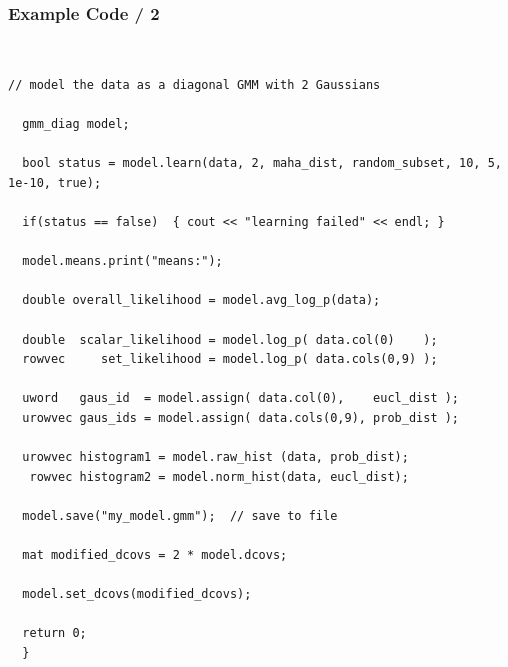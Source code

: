 \documentclass[usenames,dvipsnames]{beamer}
\begin{document}
\begin{frame}[fragile=singleslide]
\frametitle{Example Code / 2}

\vspace{-0.5ex}
\begin{minipage}{1.00\textwidth}
\begin{minipage}{0.05\textwidth}
~
\end{minipage}
\begin{minipage}{0.90\textwidth}
\begin{Verbatim}[fontsize=\tiny]
  // model the data as a diagonal GMM with 2 Gaussians
  
  gmm_diag model;
  
  bool status = model.learn(data, 2, maha_dist, random_subset, 10, 5, 1e-10, true);
  
  if(status == false)  { cout << "learning failed" << endl; }
  
  model.means.print("means:");
  
  double overall_likelihood = model.avg_log_p(data);
  
  double  scalar_likelihood = model.log_p( data.col(0)    );
  rowvec     set_likelihood = model.log_p( data.cols(0,9) );
  
  uword   gaus_id  = model.assign( data.col(0),    eucl_dist );
  urowvec gaus_ids = model.assign( data.cols(0,9), prob_dist );
  
  urowvec histogram1 = model.raw_hist (data, prob_dist);
   rowvec histogram2 = model.norm_hist(data, eucl_dist);
  
  model.save("my_model.gmm");  // save to file
  
  mat modified_dcovs = 2 * model.dcovs;
  
  model.set_dcovs(modified_dcovs);
  
  return 0;
  }
\end{Verbatim}
\end{minipage}
\end{minipage}
\end{frame}

%
%
%
\end{document}
